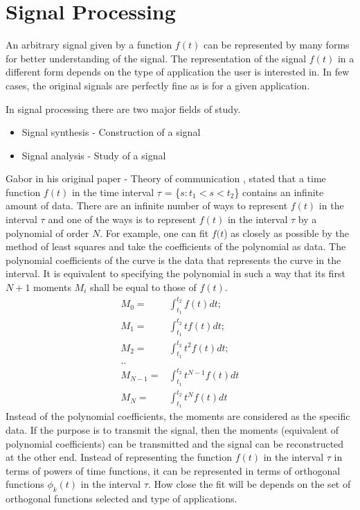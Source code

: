 \section{Signal Processing}
An arbitrary signal given by a function $f(t)$ can be represented by many forms for better understanding of the signal. The representation of the signal $f(t)$ in a different form depends on the type of application the user is interested in. In few cases, the original signals are perfectly fine as is for a given application.

In signal processing there are two major fields of study.
\begin{itemize}
  \item  {Signal synthesis - Construction of a signal}
  \item  {Signal analysis - Study of a signal}
\end{itemize}

Gabor in his original paper - Theory of communication \cite{gabor}, stated that a time function $f(t)$ in the time interval $\tau$ = \{${s:t_1<s<t_2}$\}  contains an infinite amount of data. There are an infinite number of ways to represent $f(t)$ in the interval $\tau$ and one of the ways is to represent $f(t)$ in the interval $\tau$ by a polynomial of order $N$. For example, one can fit $f(t$) as closely as possible by the method of least squares and take the coefficients of the polynomial as data. The polynomial coefficients of the curve is the data that represents the curve in the interval.  It is equivalent to specifying the polynomial in such a way that its first $N+1$ moments $M_i$ shall be equal to those of $f(t)$. 
\begin{equation*}
\begin{aligned}
M_0 =& \int_{t_1}^{t_2}{f(t)dt}; \\
M_1 =& \int_{t_1}^{t_2}{tf(t)dt}; \\
M_2 =& \int_{t_1}^{t_2}{t^2f(t)dt};\\
.. \\
M_{N-1} =& \int_{t_1}^{t_2}t^{N-1}{f(t)dt} \\
M_{N} =& \int_{t_1}^{t_2}t^{N}{f(t)dt}
\end{aligned}
\end{equation*}
Instead of the polynomial coefficients, the moments are considered as the specific data. If the purpose is to transmit the signal, then the moments (equivalent of polynomial coefficients) can be transmitted and the signal can be reconstructed at the other end.
Instead of representing the function $f(t)$ in the interval $\tau$ in terms of powers of time functions, it can be represented in terms of orthogonal functions ${\phi}_k(t)$ in the interval $\tau$. How close the fit will be depends on the set of orthogonal functions selected and type of applications.
